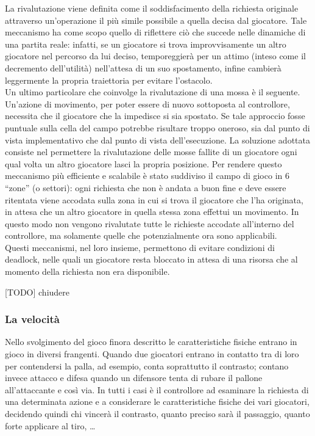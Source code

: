 La rivalutazione viene definita come il soddisfacimento della richiesta originale attraverso un'operazione il più simile possibile a quella decisa dal giocatore. Tale meccanismo ha come scopo quello di riflettere ciò che succede nelle dinamiche di una partita reale: infatti, se un giocatore si trova improvvisamente un altro giocatore nel percorso da lui deciso, temporeggierà per un attimo (inteso come il decremento dell'utilità) nell'attesa di un suo spostamento, infine cambierà leggermente la propria traiettoria per evitare l'ostacolo.\\

Un ultimo particolare che coinvolge la rivalutazione di una mossa è il seguente. Un'azione di movimento, per poter essere di nuovo sottoposta al controllore, necessita che il giocatore che la impedisce si sia spostato. Se tale approccio fosse puntuale sulla cella del campo potrebbe risultare troppo oneroso, sia dal punto di vista implementativo che dal punto di vista dell'esecuzione. La soluzione adottata consiste nel permettere la rivalutazione delle mosse fallite di un giocatore ogni qual volta un altro giocatore lasci la propria posizione. Per rendere questo meccanismo più efficiente e scalabile è stato suddiviso il campo di gioco in 6 ``zone'' (o settori): ogni richiesta che non è andata a buon fine e deve essere ritentata viene accodata sulla zona in cui si trova il giocatore che l'ha originata, in attesa che un altro giocatore in quella stessa zona effettui un movimento. In questo modo non vengono rivalutate tutte le richieste accodate all'interno del controllore, ma solamente quelle che potenzialmente ora sono applicabili.\\

Questi meccanismi, nel loro insieme, permettono di evitare condizioni di deadlock, nelle quali un giocatore resta bloccato in attesa di una risorsa che al momento della richiesta non era disponibile.

[TODO] chiudere 

\subsubsection{La velocità}
\label{sec:analisi_concorrenza_velocita}

Nello svolgimento del gioco finora descritto le caratteristiche fisiche entrano in gioco in diversi frangenti. Quando due giocatori entrano in contatto tra di loro per contendersi la palla, ad esempio, conta soprattutto il contrasto; contano invece attacco e difesa quando un difensore tenta di rubare il pallone all'attaccante e così via. In tutti i casi è il controllore ad esaminare la richiesta di una determinata azione e a considerare le caratteristiche fisiche dei vari giocatori, decidendo quindi chi vincerà il contrasto, quanto preciso sarà il passaggio, quanto forte applicare al tiro, \ldots\\

